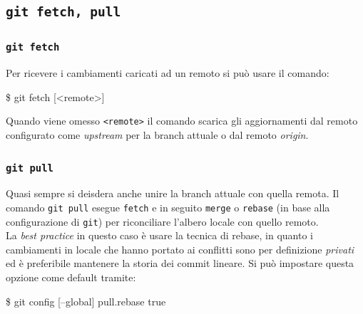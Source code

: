 \documentclass{beamer}
\begin{document}

\subsection{\texttt{git fetch, pull}}
\begin{frame}
  \frametitle{\texttt{git fetch}}
  Per ricevere i cambiamenti caricati ad un remoto si pu\`o usare il comando:
  \begin{semiverbatim}
  \$ git fetch [<remote>]
  \end{semiverbatim} \pause
  Quando viene omesso \texttt{<remote>} il comando scarica gli aggiornamenti dal
  remoto configurato come \emph{upstream} per la branch attuale o dal remoto
  \emph{origin}.
\end{frame}

\begin{frame}
  \frametitle{\texttt{git pull}}
  Quasi sempre si deisdera anche unire la branch attuale con quella remota.
  Il comando \texttt{git pull} esegue \texttt{fetch} e in seguito \texttt{merge}
  o \texttt{rebase} (in base alla configurazione di \texttt{git}) per riconciliare
  l'albero locale con quello remoto. \\\pause
  La \emph{best practice} in questo caso \`e usare la tecnica di rebase, in
  quanto i cambiamenti in locale che hanno portato ai conflitti sono per
  definizione \emph{privati} ed \`e preferibile mantenere la storia dei commit
  lineare. Si pu\`o impostare questa opzione come default tramite:
  \begin{semiverbatim}
  \$ git config [--global] pull.rebase true
  \end{semiverbatim}
\end{frame}
\end{document}
